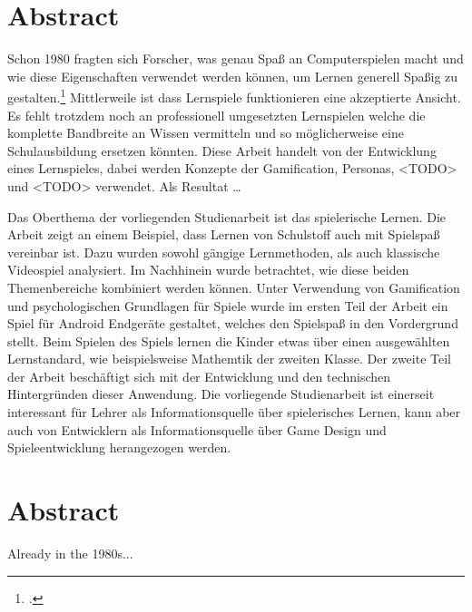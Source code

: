 \section*{Abstract}
Schon 1980 fragten sich Forscher, was genau Spaß an Computerspielen macht und wie diese Eigenschaften verwendet werden können, um Lernen generell Spaßig zu gestalten.\footcite{learn-game-history} Mittlerweile ist dass Lernspiele funktionieren eine akzeptierte Ansicht. Es fehlt trotzdem noch an professionell umgesetzten Lernspielen welche die komplette Bandbreite an Wissen vermitteln und so möglicherweise eine Schulausbildung ersetzen könnten.
Diese Arbeit handelt von der Entwicklung eines Lernspieles, dabei werden Konzepte der Gamification, Personas, <TODO> und <TODO> verwendet.
Als Resultat \dots

Das Oberthema der vorliegenden Studienarbeit ist das spielerische Lernen. Die Arbeit zeigt an einem Beispiel, dass Lernen von Schulstoff auch mit Spielspaß vereinbar ist. Dazu wurden sowohl gängige Lernmethoden, als auch klassische Videospiel analysiert. Im Nachhinein wurde betrachtet, wie diese beiden Themenbereiche kombiniert werden können. Unter Verwendung von Gamification und psychologischen Grundlagen für Spiele wurde im ersten Teil der Arbeit ein Spiel für Android Endgeräte gestaltet, welches den Spielspaß in den Vordergrund stellt. Beim Spielen des Spiels lernen die Kinder etwas über einen ausgewählten Lernstandard, wie beispielsweise Mathemtik der zweiten Klasse. Der zweite Teil der Arbeit beschäftigt sich mit der Entwicklung und den technischen Hintergründen dieser Anwendung. 
Die vorliegende Studienarbeit ist einerseit interessant für Lehrer als Informationsquelle über spielerisches Lernen, kann aber auch von Entwicklern als Informationsquelle über Game Design und Spieleentwicklung herangezogen werden.

\vfill

\section*{Abstract}
Already in the 1980s...

\vfill\newpage
